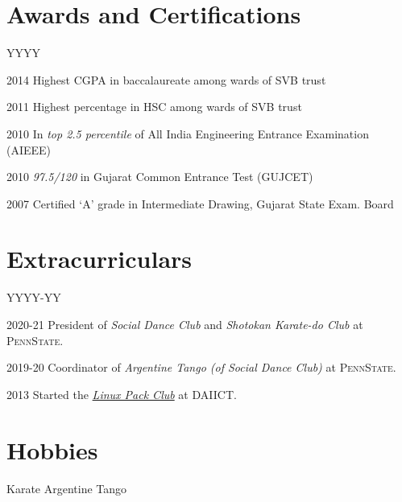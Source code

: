 \documentclass[margin]{res}
\newcommand{\daiict}{\textsc{DAIICT}}
\newcommand{\psu}{\textsc{PennState}}
\begin{document}
\begin{resume}
\section{Awards and Certifications}
\begin{labeling}{YYYY}
\item[2014] Highest CGPA in baccalaureate among wards of SVB trust
\item[2011] Highest percentage in HSC among wards of SVB trust
\item[2010] In \emph{top 2.5 percentile} of All India Engineering Entrance Examination (AIEEE)
\item[2010] \emph{97.5/120} in Gujarat Common Entrance Test (GUJCET)
\item[2007] Certified `A' grade in Intermediate Drawing, Gujarat State Exam. Board
\end{labeling}

\section{Extracurriculars}

\begin{labeling}{YYYY-YY}
\item[2020-21] President of \emph{Social Dance Club} and \emph{Shotokan Karate-do Club} at \psu.
\item[2019-20] Coordinator of \emph{Argentine Tango (of Social Dance Club)} at \psu. %
\item[2013] Started the \href{http://lpdaiict.wordpress.com/}{\itshape Linux Pack Club} at \daiict.
\end{labeling}


\section{Hobbies}
    Karate \textbullet{}
    Argentine Tango

\end{resume} 
\end{document}
